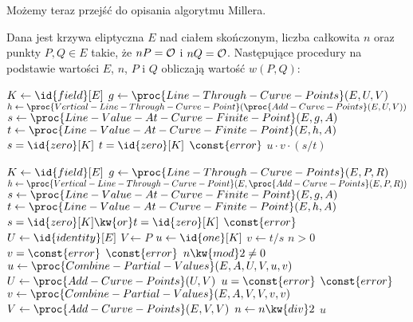 Możemy teraz przejść do opisania algorytmu Millera.

\begin{algorithm}\label{miller_alg}
Dana jest krzywa eliptyczna $E$ nad ciałem skończonym,
liczba całkowita $n$
oraz punkty $P, Q \in E$ takie, że $nP = \mathcal{O}$ i $nQ = \mathcal{O}$.
Następujące procedury
na podstawie wartości $E$, $n$, $P$ i $Q$
obliczają
wartość $w(P, Q)$:

\begin{codebox}
\li
    $K \gets \id{field}[E]$
\li
    $g \gets \proc{Line-Through-Curve-Points}(E, U, V)$
\li
    $h \gets \proc{Vertical-Line-Through-Curve-Point}(\proc{Add-Curve-Points}(E, U, V))$
\li
    $s \gets \proc{Line-Value-At-Curve-Finite-Point}(E, g, A)$
\li
    $t \gets \proc{Line-Value-At-Curve-Finite-Point}(E, h, A)$
\li
    \If $s = \id{zero}[K]$  $t = \id{zero}[K]$
\li
        \Then \Return $\const{error}$
    \End
\li
    \Return $u \cdot v \cdot (s / t)$
\end{codebox}

\begin{codebox}
\li
    $K \gets \id{field}[E]$
\li
    $g \gets \proc{Line-Through-Curve-Points}(E, P, R)$
\li
    $h \gets \proc{Vertical-Line-Through-Curve-Point}(E, \proc{Add-Curve-Points}(E, P, R))$
\li
    $s \gets \proc{Line-Value-At-Curve-Finite-Point}(E, g, A)$
\li
    $t \gets \proc{Line-Value-At-Curve-Finite-Point}(E, h, A)$
\li
    \If $s = \id{zero}[K] \kw{ or } t = \id{zero}[K]$
\li
    \Then
        \Return $\const{error}$
    \End
\li
    $U \gets \id{identity}[E]$
\li
    $V \gets P$
\li
    $u \gets \id{one}[K]$
\li
    $v \gets t / s$
\li
    \While $n > 0$
\li
        \Do
            \If $v = \const{error}$
\li
                \Then
                    \Return $\const{error}$
                \End
\li
            \If $n \kw{ mod } 2 \neq 0$
\li
                \Then
                    $u \gets \proc{Combine-Partial-Values}(E, A, U, V, u, v)$
\li
                    $U \gets \proc{Add-Curve-Points}(U, V)$
\li
                    \If $u = \const{error}$
\li
                        \Then
                            \Return $\const{error}$
                        \End
                \End
\li
            $v \gets \proc{Combine-Partial-Values}(E, A, V, V, v, v)$
\li
            $V \gets \proc{Add-Curve-Points}(E, V, V)$
\li
            $n \gets n \kw{ div } 2$
        \End
\li
    \Return $u$
\end{codebox}


\end{algorithm}

